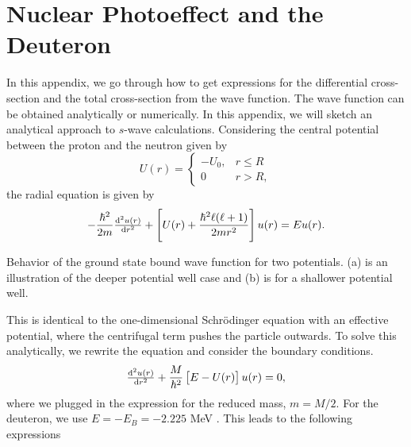 \chapter{Nuclear Photoeffect and the Deuteron}\label{app:deuteron}
In this appendix, we go through how to get expressions for the differential cross-section and the total cross-section from the wave function. The wave function can be obtained analytically or numerically. In this appendix, we will sketch an analytical approach to $s$-wave calculations. 
Considering the central potential between the proton and the neutron given by
\[ U(r)= \begin{cases}
	-U_0, & r \leq R \\
	0 & r > R,
\end{cases}
\]
the radial equation is given by
\begin{equation}
	-\frac{\hbar^2}{2m} \od[2]{u(r)}{r}+\left[U(r)+\frac{\hbar^2 \ell(\ell+1)}{2mr^2} \right]u(r)=Eu(r).
\end{equation}
\begin{marginfigure}
	\centering
	
	\caption{Behavior of the ground state bound wave function for two potentials. (a) is an illustration of the deeper potential well case and (b) is for a shallower potential well. }
\end{marginfigure}
This is identical to the one-dimensional Schrödinger equation with an effective potential, where the centrifugal term pushes the particle outwards. To solve this analytically, we rewrite the equation and consider the boundary conditions.
\begin{equation} \label{SEnew}
	\od[2]{u(r)}{r}+\frac{M}{\hbar^2} \left[E-U(r) \right]u(r)=0,
\end{equation}
where we plugged in the expression for the reduced mass, $m=M/2$. For the deuteron, we use $E=-E_B = -2.225$ MeV \cite{KerneII}. This leads to the following expressions

